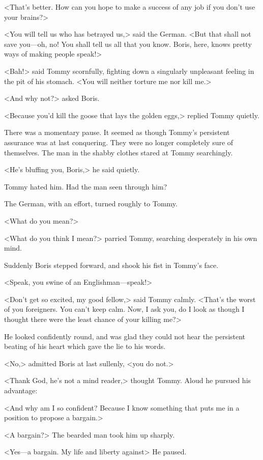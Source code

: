 <That's better. How can you hope to make a success of any job if you don't use your brains?>

<You will tell us who has betrayed us,> said the German. <But that shall not save you—oh, no! You shall tell us all that you know. Boris, here, knows pretty ways of making people speak!>

<Bah!> said Tommy scornfully, fighting down a singularly unpleasant feeling in the pit of his stomach. <You will neither torture me nor kill me.>

<And why not?> asked Boris.

<Because you'd kill the goose that lays the golden eggs,> replied Tommy quietly.

There was a momentary pause. It seemed as though Tommy's persistent assurance was at last conquering. They were no longer completely sure of themselves. The man in the shabby clothes stared at Tommy searchingly.

<He's bluffing you, Boris,> he said quietly.

Tommy hated him. Had the man seen through him?

The German, with an effort, turned roughly to Tommy.

<What do you mean?>

<What do you think I mean?> parried Tommy, searching desperately in his own mind.

Suddenly Boris stepped forward, and shook his fist in Tommy's face.

<Speak, you swine of an Englishman—speak!>

<Don't get so excited, my good fellow,> said Tommy calmly. <That's the worst of you foreigners. You can't keep calm. Now, I ask you, do I look as though I thought there were the least chance of your killing me?>

He looked confidently round, and was glad they could not hear the persistent beating of his heart which gave the lie to his words.

<No,> admitted Boris at last sullenly, <you do not.>

<Thank God, he's not a mind reader,> thought Tommy. Aloud he pursued his advantage:

<And why am I so confident? Because I know something that puts me in a position to propose a bargain.>

<A bargain?> The bearded man took him up sharply.

<Yes—a bargain. My life and liberty against\longdash> He paused.

